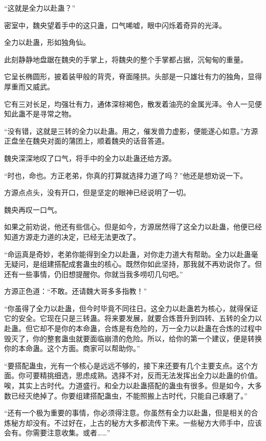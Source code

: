 
\begin{this_body}

“这就是全力以赴蛊？”

密室中，魏央望着手中的这只蛊，口气唏嘘，眼中闪烁着奇异的光泽。

全力以赴蛊，形如独角仙。

此刻静静地盘踞在魏央的手掌上，将魏央的整个手掌都占据，沉甸甸的重量。

它呈长椭圆形，披着装甲般的背壳，脊面隆拱。头部是一只雄壮有力的独角，显得厚重而又威武。

它有三对长足，均强壮有力，通体深棕褐色，散发着油亮的金属光泽。令人一见便知此蛊不是寻常之物。

“没有错，这就是三转的全力以赴蛊。用之，催发兽力虚影，便能遂心如意。”方源正盘坐在魏央对面的蒲团上，顺着魏央的话音答道。

魏央深深地叹了口气，将手中的全力以赴蛊还给方源。

“时也，命也。方正老弟，你真的打算就选择力道了吗？”他还是想劝说一下。

方源点点头，没有开口，但是坚定的眼神已经说明了一切。

魏央再叹一口气。

如果之前劝说，他还有些信心。但是如今，方源居然得了这全力以赴蛊，他便已经知道方源走力道的决定，已经无法更改了。

“命运真是奇妙，老弟你能得到全力以赴蛊，对你走力道大有帮助。全力以赴蛊毫无疑问，是组建搭配成套蛊虫的核心。既然你如此坚持，那我就不再劝说你了。但还有一些事情，仍旧想提醒你。你就当我多唠叨几句吧。”

方源正色道：“不敢。还请魏大哥多多指教！”

“你虽得了全力以赴蛊，但今时毕竟不同往日。这全力以赴蛊若为核心，就得保证它的安全。它现在只是三转蛊。将来要发展，就要合炼晋升到四转、五转的全力以赴蛊。但它却不是你的本命蛊，合炼是有危险的，万一全力以赴蛊在合炼的过程中毁灭了，你的整套蛊虫就要面临崩溃的危险。所以，给你的第一个建议，便是转换你的本命蛊。这个方面。商家可以帮助你。”

“要搭配蛊虫，光有一个核心是远远不够的，接下来还要有几个主要支点。这个方面。你可要精挑细选，思虑成熟。选择不对，反而无法发挥出全力以赴蛊的价值。唉，其实上古时代。力道盛行。和全力以赴蛊搭配的蛊虫有很多。但是如今，大多数已经灭绝掉了。你要组建搭配蛊虫，不能照搬上古时代，只能自己琢磨了。”

“还有一个极为重要的事情，你必须得注意。你虽然有全力以赴蛊，但是相关的合炼秘方却没有。不过好在，上古的秘方大多都流传下来。一些秘方大师手中，应该会有。你需要注意收集。或者……”


\end{this_body}
